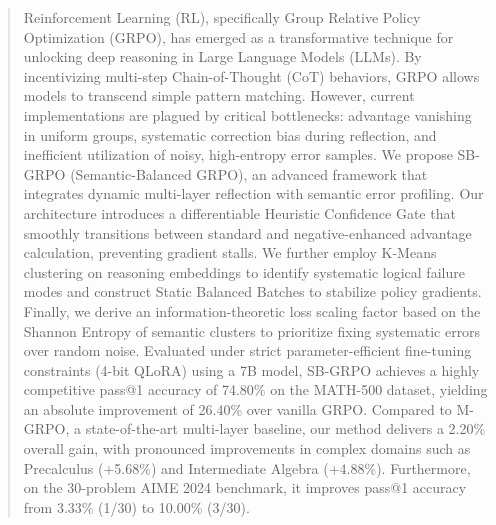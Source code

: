 \begin{abstract}
Reinforcement Learning (RL), specifically Group Relative Policy Optimization (GRPO), has emerged as a transformative technique for unlocking deep reasoning in Large Language Models (LLMs). By incentivizing multi-step Chain-of-Thought (CoT) behaviors, GRPO allows models to transcend simple pattern matching. However, current implementations are plagued by critical bottlenecks: advantage vanishing in uniform groups, systematic correction bias during reflection, and inefficient utilization of noisy, high-entropy error samples. We propose SB-GRPO (Semantic-Balanced GRPO), an advanced framework that integrates dynamic multi-layer reflection with semantic error profiling. Our architecture introduces a differentiable Heuristic Confidence Gate that smoothly transitions between standard and negative-enhanced advantage calculation, preventing gradient stalls. We further employ K-Means clustering on reasoning embeddings to identify systematic logical failure modes and construct Static Balanced Batches to stabilize policy gradients. Finally, we derive an information-theoretic loss scaling factor based on the Shannon Entropy of semantic clusters to prioritize fixing systematic errors over random noise. Evaluated under strict parameter-efficient fine-tuning constraints (4-bit QLoRA) using a 7B model, SB-GRPO achieves a highly competitive pass@1 accuracy of 74.80\% on the MATH-500 dataset, yielding an absolute improvement of 26.40\% over vanilla GRPO. Compared to M-GRPO, a state-of-the-art multi-layer baseline, our method delivers a 2.20\% overall gain, with pronounced improvements in complex domains such as Precalculus (+5.68\%) and Intermediate Algebra (+4.88\%). Furthermore, on the 30-problem AIME 2024 benchmark, it improves pass@1 accuracy from 3.33\% (1/30) to 10.00\% (3/30).

\end{abstract}